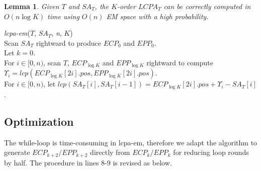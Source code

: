 \documentclass{llncs}
\newtheorem{lem}{Lemma}
\begin{document}
\begin{lem}
\label{thm:lcp:em}
Given $T$ and $SA_T$, the $K$-order $LCPA_T$ can be correctly computed in $O(n \log K)$ time using $O(n)$ {EM} space with a high probability.
\end{lem}

\begin{algorithm}[hbtp!]
\caption{Compute $K$-Order $LCPA_T$ in EM}
\label{fig:alg:em}
{\em lcpa-em}($T$, $SA_T$, {\em n}, $K$){\\
\SetAlgoNoLine
Scan $SA_T$ rightward to produce $ECP_0$ and $EPP_0$.\\
Let $k = 0$. \\
\While{$k < \log K$}{
\Indentp{-1em}
Radix-sort $ECP_k$ and $EPP_k$ by $pos$ to form $IECP_k$ and $IEPP_k$. \\
For $i\in [0,n)$ and $j\in [0,2n)$, scan $T$ rightward to iteratively compute the finger-print of ${\sf pre}(T,i)$ and set $IECP_k[j].fp$ or $IEPP_k[j].fp$ to $FP[0,i]$ if $IECP_k[j].pos = i$ or $IEPP_k[j].pos = i$. \\
Radix-sort $IECP_k$ and $IEPP_k$ to $ECP_k$ and $EPP_k$ by $idx$. \\
For $i \in [0,n)$, scan $ECP_k$ and $EPP_k$ rightward to compute and compare each pair of $(FP[ECP_k[2i].pos+1,ECP_k[2i+1].pos], FP[EPP_k[2i].pos+1,EPP_k[2i+1].pos])$ for generating $ECP_{k+1}$ and $EPP_{k+1}$. \\
Let $k = k + 1$. \\
}
For $i \in [0,n)$, scan $T$, $ECP_{\log K}$ and $EPP_{\log K}$ rightward to compute $\Upsilon_i = lcp(ECP_{\log K}[2i].pos,EPP_{\log K}[2i].pos)$. \\
For $i \in [0,n)$, let $lcp(SA_T[i],SA_T[i-1])=ECP_{\log K}[2i].pos+\Upsilon_i-SA_T[i]$.\\
}
\end{algorithm}

\subsection{Optimization}\label{subsec:optimization}

The while-loop is time-consuming in {lcpa-em}, therefore we adapt the algorithm to generate $ECP_{k+2}/EPP_{k+2}$ directly from $ECP_k/EPP_k$ for reducing loop rounds by half. The procedure in lines 8-9 is revised as below.
\end{document}
